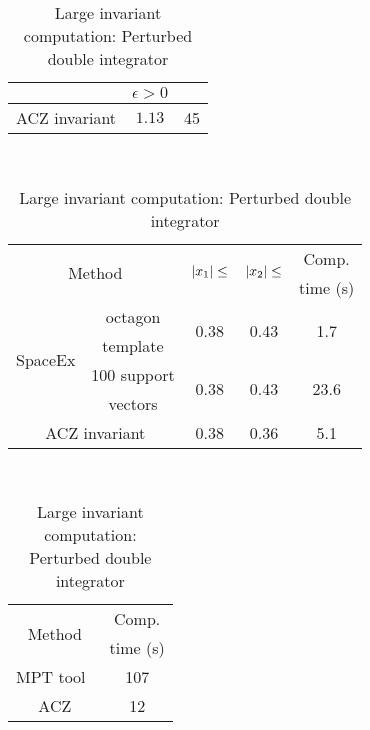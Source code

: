 \begin{table}
\begin{minipage}{0.48\textwidth}
\begin{tabular}{|l|c|c|c|}
\multicolumn{2}{|c|}{} & $\epsilon>0$ &\\
\hline
\multicolumn{2}{|c|}{\multirow{2}{*}{ACZ invariant}} & \multirow{2}{*}{$1.13$} &
\multirow{2}{*}{45}\\
\multicolumn{2}{|c|}{} & &\\
\hline
\end{tabular}
\caption{Saturated robot model: results}
~\label{tab:robot-saturated}
\end{minipage}
\begin{minipage}{0.45\textwidth}
\begin{tabular}{|l|c|c|c|c|}
\hline
\multicolumn{2}{|c|}{\multirow{2}{*}{Method}} &
\multirow{2}{*}{$\left|x_1\right|\leq$} & \multirow{2}{*}{$\left|x_2\right|\leq$} & Comp.\\
\multicolumn{2}{|c|}{} & & & time (s) \\
\hline
\multirow{4}{*}{SpaceEx} & octagon & \multirow{2}{*}{0.38} &
\multirow{2}{*}{0.43} & \multirow{2}{*}{1.7}\\
& template & & &\\
\cline{2-5}
& 100 support & \multirow{2}{*}{0.38} & \multirow{2}{*}{0.43} & \multirow{2}{*}{23.6}\\
& vectors & & &\\
\hline
\multicolumn{2}{|c|}{\multirow{2}{*}{ACZ invariant}} &
\multirow{2}{*}{0.38} & \multirow{2}{*}{0.36} & 
\multirow{2}{*}{5.1}\\
\multicolumn{2}{|c|}{} & & &\\
\hline
\end{tabular}
\caption{Small invariant computation:\newline Perturbed double
  integrator}
~\label{tab:smallinv-pdi}
\vspace{1em}
\end{minipage}
\hspace{4em}
\begin{minipage}{0.4\textwidth}
\begin{tabular}{|c|c|}
\hline
\multirow{2}{*}{Method} & Comp.\\
& time (s)\\
\hline
\multirow{2}{*}{MPT tool~\cite{rakovic2004computation}} & \multirow{2}{*}{107}\\
& \\
\hline
\multirow{2}{*}{ACZ} & \multirow{2}{*}{12}\\
& \\
\hline
\end{tabular}
\caption{Large invariant computation: Perturbed double integrator}

\end{minipage}
\end{table}
